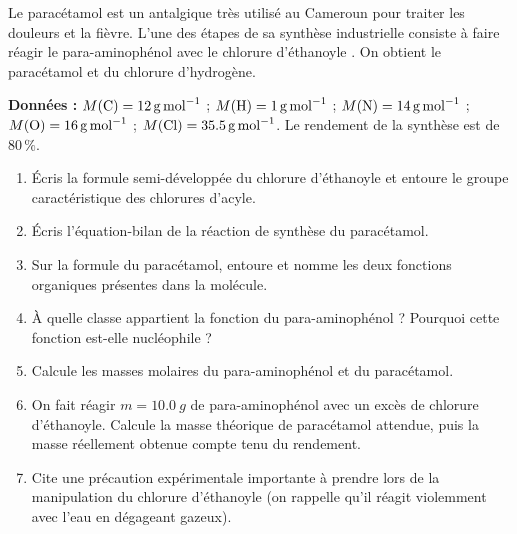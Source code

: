 \documentclass[11pt]{article}
\begin{document}
\begin{exercice}
Le paracétamol est un antalgique très utilisé au Cameroun pour traiter les douleurs et la fièvre. L'une des étapes de sa synthèse industrielle consiste à faire réagir le para-aminophénol  avec le chlorure d'éthanoyle . On obtient le paracétamol  et du chlorure d'hydrogène.

\medskip
\textbf{Données :} $M(\ce{C}) = \SI{12}{g.mol^{-1}}$ ; $M(\ce{H}) = \SI{1}{g.mol^{-1}}$ ; $M(\ce{N}) = \SI{14}{g.mol^{-1}}$ ; $M(\ce{O}) = \SI{16}{g.mol^{-1}}$ ; $M(\ce{Cl}) = \SI{35,5}{g.mol^{-1}}$. Le rendement de la synthèse est de $80\,\%$.
\begin{enumerate}
\item Écris la formule semi-développée du chlorure d'éthanoyle et entoure le groupe caractéristique des chlorures d'acyle.
\item Écris l'équation-bilan de la réaction de synthèse du paracétamol.
\item Sur la formule du paracétamol, entoure et nomme les deux fonctions organiques présentes dans la molécule.
\item À quelle classe appartient la fonction  du para-aminophénol ? Pourquoi cette fonction est-elle nucléophile ?
\item Calcule les masses molaires du para-aminophénol et du paracétamol.
\item On fait réagir $m = \SI{10,0}{g}$ de para-aminophénol avec un excès de chlorure d'éthanoyle. Calcule la masse théorique de paracétamol attendue, puis la masse réellement obtenue compte tenu du rendement.
\item Cite une précaution expérimentale importante à prendre lors de la manipulation du chlorure d'éthanoyle (on rappelle qu'il réagit violemment avec l'eau en dégageant  gazeux).
\end{enumerate}
\end{exercice}
\end{document}
